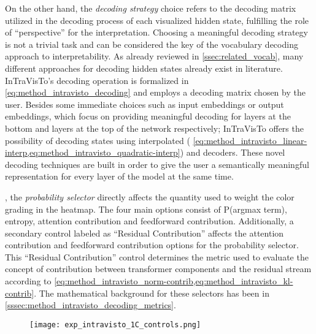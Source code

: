 On the other hand, the \emph{decoding strategy} choice refers to the decoding matrix utilized in the decoding process of each visualized hidden state, fulfilling the role of ``perspective'' for the interpretation.
Choosing a meaningful decoding strategy is not a trivial task and can be considered the key  of the vocabulary decoding approach to interpretability.
As already reviewed in \cref{ssec:related_vocab}, many different approaches for decoding hidden states already exist in literature.
InTraVisTo's decoding operation is formalized in \cref{eq:method_intravisto_decoding} and employs a decoding matrix chosen by the user.
Besides some immediate choices such as input embeddings or output embeddings, which focus on providing meaningful decoding for layers at the bottom and layers at the top of the network respectively; InTraVisTo offers the possibility of decoding states using interpolated ( \cref{eq:method_intravisto_linear-interp,eq:method_intravisto_quadratic-interp}) and  decoders.
These novel decoding techniques are built in order to give the user a semantically meaningful representation for every layer of the model at the same time.

, the \emph{probability selector} directly affects the quantity used to weight the color grading in the heatmap.
The four main options consist of P(argmax term), entropy, attention contribution and feedforward contribution.
Additionally, a secondary control labeled as ``Residual Contribution'' affects the attention contribution and feedforward contribution options for the probability selector.
This ``Residual Contribution'' control determines the metric used to evaluate the concept of contribution between transformer components and the residual stream according to \cref{eq:method_intravisto_norm-contrib,eq:method_intravisto_kl-contrib}.
The mathematical background for these selectors has been  in \cref{sssec:method_intravisto_decoding_metrics}.

\begin{figure}[t!]
    \centering
    \texttt{[image: exp\_intravisto\_1C\_controls.png]}
    \caption{}
    \label{fig:exp_intravisto_1_C}
\end{figure}

